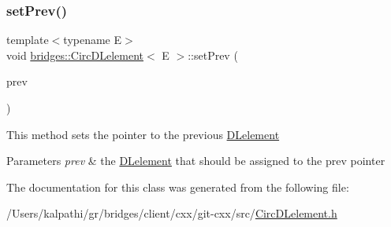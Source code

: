 \subsubsection{\texorpdfstring{set\+Prev()}{setPrev()}}
{\footnotesize\ttfamily template$<$typename E$>$ \\
void \hyperlink{classbridges_1_1_circ_d_lelement}{bridges\+::\+Circ\+D\+Lelement}$<$ E $>$\+::set\+Prev (\begin{DoxyParamCaption}\item[{\hyperlink{classbridges_1_1_circ_d_lelement}{Circ\+D\+Lelement}$<$ E $>$ $\ast$}]{prev }\end{DoxyParamCaption})\hspace{0.3cm}{\ttfamily [inline]}}

This method sets the pointer to the previous \hyperlink{classbridges_1_1_d_lelement}{D\+Lelement} 
\begin{DoxyParams}{Parameters}
{\em prev} & the \hyperlink{classbridges_1_1_d_lelement}{D\+Lelement} that should be assigned to the prev pointer \\
\hline
\end{DoxyParams}


The documentation for this class was generated from the following file\+:\begin{DoxyCompactItemize}
\item 
/\+Users/kalpathi/gr/bridges/client/cxx/git-\/cxx/src/\hyperlink{_circ_d_lelement_8h}{Circ\+D\+Lelement.\+h}\end{DoxyCompactItemize}
